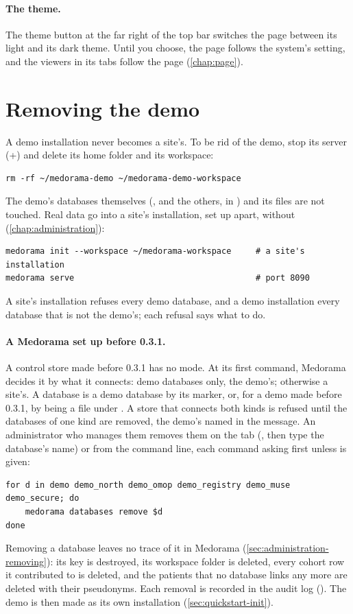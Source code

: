 \paragraph{The theme.} The theme button at the far right of the top bar switches the page
between its light and its dark theme. Until you choose, the page follows the system's setting,
and the viewers in its tabs follow the page (\cref{chap:page}).

\section{Removing the demo}
\label{sec:quickstart-remove}

A demo installation never becomes a site's. To be rid of the demo, stop its server
(+) and delete its home folder and its workspace:
\begin{lstlisting}[style=shell]
rm -rf ~/medorama-demo ~/medorama-demo-workspace
\end{lstlisting}
The demo's databases themselves (,  and the others, in
) and its files are not touched. Real data go into a site's
installation, set up apart, without  (\cref{chap:administration}):
\begin{lstlisting}[style=shell]
medorama init --workspace ~/medorama-workspace     # a site's installation
medorama serve                                     # port 8090
\end{lstlisting}
A site's installation refuses every demo database, and a demo installation every database that is
not the demo's; each refusal says what to do.

\paragraph{A Medorama set up before 0.3.1.} A control store made before 0.3.1 has no mode. At its
first command, Medorama decides it by what it connects: demo databases only, the demo's;
otherwise a site's. A database is a demo database by its marker, or, for a demo made before 0.3.1,
by being a file under . A store that connects both kinds is
refused until the databases of one kind are removed, the demo's named in the message. An
administrator who manages them removes them on the  tab (, then
type the database's name) or from the command line, each command asking first unless
 is given:
\begin{lstlisting}[style=shell]
for d in demo demo_north demo_omop demo_registry demo_muse demo_secure; do
    medorama databases remove $d
done
\end{lstlisting}
Removing a database leaves no trace of it in Medorama (\cref{sec:administration-removing}): its
key is destroyed, its workspace folder is deleted, every cohort row it contributed to is deleted,
and the patients that no database links any more are deleted with their pseudonyms. Each removal
is recorded in the audit log (). The demo is then made as its own installation
(\cref{sec:quickstart-init}).


